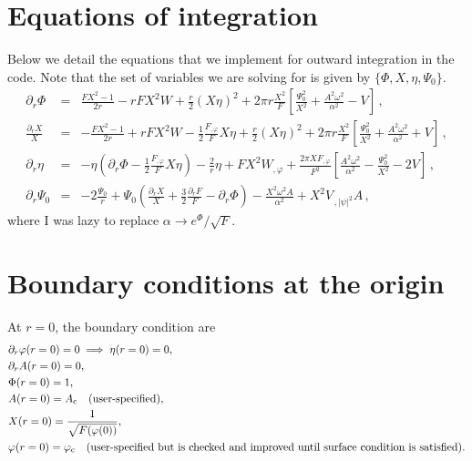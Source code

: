 \documentclass[12pt]{article}
\numberwithin{equation}{section}
\begin{document}
\section{Equations of integration}
Below we detail the equations that we implement for outward integration in the code. Note that the set of variables we are solving for is given by $\{\Phi, X, \eta, \Psi_0 \}$.
\begin{eqnarray}
  \partial_r \Phi
  &=&
  \frac{FX^2-1}{2r}
  -rFX^2W
  +\frac{r}{2}(X \eta)^2
  +2\pi r\frac{X^2}{F}\left[
  \frac{\Psi_0^2}{X^2}
  +\frac{A^2 \omega^2}{\alpha^2}
  -V
  \right]\,,
  \label{eq:Phir}
  \\[10pt]
  \frac{\partial_r X}{X}
  &=&
  -\frac{FX^2-1}{2r}
  +rFX^2W
  -\frac{1}{2}\frac{F_{, \varphi}}{F} X \eta
  +\frac{r}{2}(X \eta)^2
  +2\pi r\frac{X^2}{F}
  \left[
  \frac{\Psi_0^2}{X^2}
  +\frac{A^2 \omega^2}{\alpha^2}
  +V
  \right]\,,
  \label{eq:Xr}
  \\[10pt]
  \partial_r \eta
  &=&
  -\eta \left(
  \partial_r \Phi
  -\frac{1}{2} \frac{F_{, \varphi}}{F} X \eta
  \right)
  -\frac{2}{r}\eta
  + FX^2 W_{,\varphi}
  +\frac{2\pi XF_{,\varphi}}{F^2}
  \left[
  \frac{A^2\omega^2}{\alpha^2}
  -\frac{\Psi_0^2}{X^2}
  -2V
  \right]\,,
  \label{eq:etar}
  \\[10pt]
  \partial_r \Psi_0 &=&
  -2\frac{\Psi_0}{r}
  +\Psi_0 \left(
  \frac{\partial_r X}{X}
  + \frac{3}{2}\frac{\partial_r F}{F}
  - \partial_r \Phi
  \right)
  - \frac{X^2\omega^2 A}{\alpha^2}
  + X^2V_{\,,|\psi|^2} A\,,
  \label{eq:Psi0r}
\end{eqnarray}
where I was lazy to replace $\alpha \rightarrow e^{\Phi}/\sqrt{F}$.

\section{Boundary conditions at the origin}
At $r = 0$, the boundary condition are
\begin{align}
    &\partial_r \varphi (r = 0) = 0 \implies \eta(r = 0) = 0, \\
    &\partial_r A (r = 0) = 0, \\
    &\Phi(r = 0) = 1, \\
    &A(r = 0) = A_{\rm{c}} \quad \text{(user-specified)}, \\
    &X(r = 0) = \frac{1}{\sqrt{F(\varphi(0))}}, \\
    &\varphi(r = 0) = \varphi_{\rm{c}} \quad \text{(user-specified but is checked and improved until surface condition is satisfied)}.
    \label{eq:bcsattheorigin}
\end{align}
\end{document}

